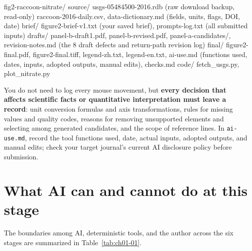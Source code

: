 \begin{Prompt}
fig2-raccoon-nitrate/
  source/   usgs-05484500-2016.rdb (raw download backup, read-only)
            raccoon-2016-daily.csv, data-dictionary.md (fields, units, flags, DOI, date)
  brief/    figure2-brief-v1.txt (your saved brief), prompts-log.txt (all submitted inputs)
  drafts/   panel-b-draft1.pdf, panel-b-revised.pdf, panel-a-candidates/,
            revision-notes.md (the 8 draft defects and return-path revision log)
  final/    figure2-final.pdf, figure2-final.tiff, legend-zh.txt, legend-en.txt,
            ai-use.md (functions used, dates, inputs, adopted outputs, manual edits), checks.md
  code/     fetch_usgs.py, plot_nitrate.py
\end{Prompt}

You do not need to log every mouse movement, but \textbf{every decision that affects scientific facts or quantitative interpretation must leave a record}: unit conversion formulas and axis transformations, rules for missing values and quality codes, reasons for removing unsupported elements and selecting among generated candidates, and the scope of reference lines. In \texttt{ai-use.md}, record the tool functions used, date, actual inputs, adopted outputs, and manual edits; check your target journal's current AI disclosure policy before submission.

\section{What AI can and cannot do at this stage}

The boundaries among AI, deterministic tools, and the author across the six stages are summarized in Table~\ref{tab:ch01-01}.

